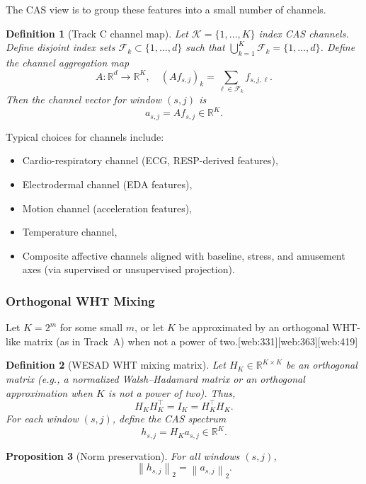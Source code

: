 \documentclass[11pt]{article}
\newtheorem{definition}{Definition}[section]
\newtheorem{proposition}[definition]{Proposition}
\newcommand{\R}{\mathbb{R}}
\newcommand{\norm}[1]{\left\lVert #1 \right\rVert}
\begin{document}
The CAS view is to group these features into a small number of channels.

\begin{definition}[Track C channel map]
Let \(\mathcal{K} = \{1,\dots,K\}\) index CAS channels.
Define disjoint index sets \(\mathcal{F}_k \subset \{1,\dots,d\}\) such that \(\bigcup_{k=1}^K \mathcal{F}_k = \{1,\dots,d\}\).
Define the channel aggregation map
\[
  A : \R^d \to \R^K, \quad
  (A f_{s,j})_k = \sum_{\ell \in \mathcal{F}_k} f_{s,j,\ell}.
\]
Then the channel vector for window \((s,j)\) is
\[
  a_{s,j} = A f_{s,j} \in \R^K.
\]
\end{definition}

Typical choices for channels include:

\begin{itemize}
  \item Cardio-respiratory channel (ECG, RESP-derived features),
  \item Electrodermal channel (EDA features),
  \item Motion channel (acceleration features),
  \item Temperature channel,
  \item Composite affective channels aligned with baseline, stress, and amusement axes (via supervised or unsupervised projection).
\end{itemize}

\subsubsection{Orthogonal WHT Mixing}

Let \(K = 2^m\) for some small \(m\), or let \(K\) be approximated by an orthogonal WHT-like matrix (as in Track~A) when not a power of two.\cite{WHTOverview,WHTOrthogonal}[web:331][web:363][web:419]

\begin{definition}[WESAD WHT mixing matrix]
Let \(H_K \in \R^{K \times K}\) be an orthogonal matrix (e.g., a normalized Walsh--Hadamard matrix or an orthogonal approximation when \(K\) is not a power of two).
Thus,
\[
  H_K H_K^\top = I_K = H_K^\top H_K.
\]
For each window \((s,j)\), define the CAS spectrum
\[
  h_{s,j} = H_K a_{s,j} \in \R^K.
\]
\end{definition}

\begin{proposition}[Norm preservation]
For all windows \((s,j)\),
\[
  \norm{h_{s,j}}_2 = \norm{a_{s,j}}_2.
\]
\end{proposition}
\end{document}
